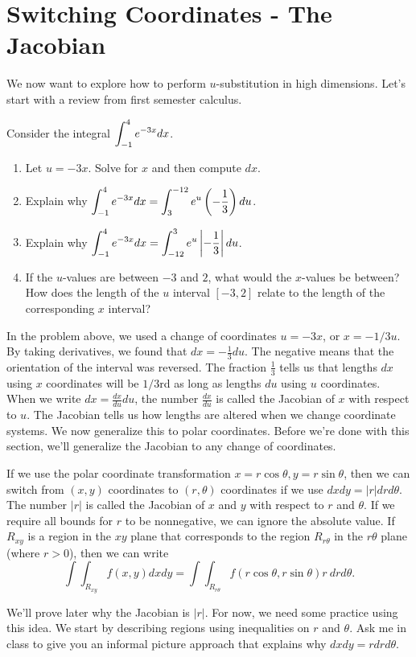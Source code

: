 \section{Switching Coordinates - The Jacobian}

We now want to explore how to perform $u$-substitution in high dimensions. Let's start with a review from first semester calculus.

\begin{problem}
Consider the integral $\displaystyle\int_{-1}^4 e^{-3x} dx$.  
\begin{enumerate}
 \item Let $u=-3x$.  Solve for $x$ and then compute $dx$.
 \item Explain why $\displaystyle\int_{-1}^4 e^{-3x} dx=\int_{3}^{-12}e^u \left(-\frac{1}{3}\right)du$.  
 \item Explain why $\displaystyle\int_{-1}^4 e^{-3x} dx=\int_{-12}^{3}e^u \left|-\frac{1}{3}\right| du$.
 \item If the $u$-values are between $-3$ and $2$, what would the $x$-values be between? How does the  length of the $u$ interval $[-3,2]$ relate to the length of the corresponding $x$ interval?
\end{enumerate}
\end{problem}

In the problem above, we used a change of coordinates $u=-3x$, or $x=-1/3 u$.  By taking derivatives, we found that $dx=-\frac{1}{3}du$. The negative means that the orientation of the interval was reversed. The fraction $\frac13$ tells us that lengths $dx$ using $x$ coordinates will be $1/3$rd as long as lengths $du$ using $u$ coordinates. When we write $dx = \frac{dx}{du}du$, the number $\frac{dx}{du}$ is called the Jacobian of $x$ with respect to $u$. The Jacobian tells us how lengths are altered when we change coordinate systems. We now generalize this to polar coordinates. Before we're done with this section, we'll generalize the Jacobian to any change of coordinates.

\begin{theorem}
 If we use the polar coordinate transformation $x=r\cos\theta, y=r\sin\theta$, then we can switch from $(x,y)$ coordinates to $(r,\theta)$ coordinates if we use $dxdy=|r|drd\theta$.  The number $|r|$ is called the Jacobian of $x$ and $y$ with respect to $r$ and $\theta$. If we require all bounds for $r$ to be nonnegative, we can ignore the absolute value.  If $R_{xy}$ is a region in the $xy$ plane that corresponds to the region $R_{r\theta}$ in the $r\theta$ plane (where $r>0$), then we can write $$\int\int_{R_{xy}} f(x,y) dxdy = \int\int_{R_{r\theta}} f(r\cos\theta,r\sin\theta) r\ drd\theta.$$ 
\end{theorem}
We'll prove later why the Jacobian is $|r|$.  For now, we need some practice using this idea. We start by describing regions using inequalities on $r$ and $\theta$.  Ask me in class to give you an informal picture approach that explains why 
$dxdy=rdrd\theta$.  

